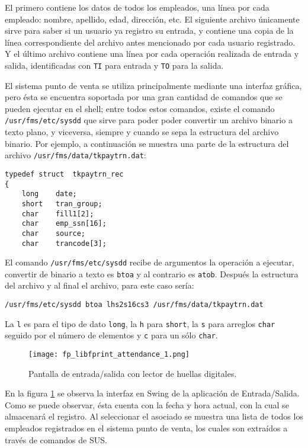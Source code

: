 El primero contiene los datos de todos los empleados, una línea por cada empleado: nombre, apellido, edad, dirección, etc. El siguiente archivo únicamente sirve para saber si un usuario ya registro su entrada, y contiene una copia de la línea correspondiente del archivo antes mencionado por cada usuario registrado. Y el último archivo contiene una línea por cada operación realizada de entrada y salida, identificadas con \texttt{TI} para entrada y \texttt{TO} para la salida.

El sistema punto de venta se utiliza principalmente mediante una interfaz gráfica, pero ésta se encuentra soportada por una gran cantidad de comandos que se pueden ejecutar en el shell; entre todos estos comandos, existe el comando\\ \texttt{/usr/fms/etc/sysdd} que sirve para poder poder convertir un archivo binario a texto plano, y viceversa, siempre y cuando se sepa la estructura del archivo binario. Por ejemplo, a continuación se muestra una parte de la estructura del archivo \texttt{/usr/fms/data/tkpaytrn.dat}:

\begin{Verbatim}
typedef struct  tkpaytrn_rec
{
    long    date;
    short   tran_group;
    char    fill1[2];
    char    emp_ssn[16];
    char    source;
    char    trancode[3];
\end{Verbatim}

El comando \texttt{/usr/fms/etc/sysdd} recibe de argumentos la operación a ejecutar, convertir de binario a texto es \texttt{btoa} y al contrario es \texttt{atob}. Después la estructura del archivo y al final el archivo, para este caso sería: 

\texttt{/usr/fms/etc/sysdd btoa lhs2s16cs3 /usr/fms/data/tkpaytrn.dat}

La \texttt{l} es para el tipo de dato \texttt{long}, la \texttt{h} para \texttt{short}, la \texttt{s} para arreglos \texttt{char} seguido por el número de elementos y \texttt{c} para un sólo \texttt{char}.

\begin{figure}[htb]
 \begin{center}
  \texttt{[image: fp\_libfprint\_attendance\_1.png]}
 \end{center}
 \caption{Pantalla de entrada/salida con lector de huellas digitales.}
 \label{fig:finger_print_5}
\end{figure}


En la figura \ref{fig:finger_print_5} se observa la interfaz en Swing de la aplicación de Entrada/Salida. Como se puede observar, ésta cuenta con la fecha y hora actual, con la cual se almacenará el registro. Al seleccionar el asociado se muestra una lista de todos los empleados registrados en el sistema punto de venta, los cuales son extraídos a través de comandos de SUS.

